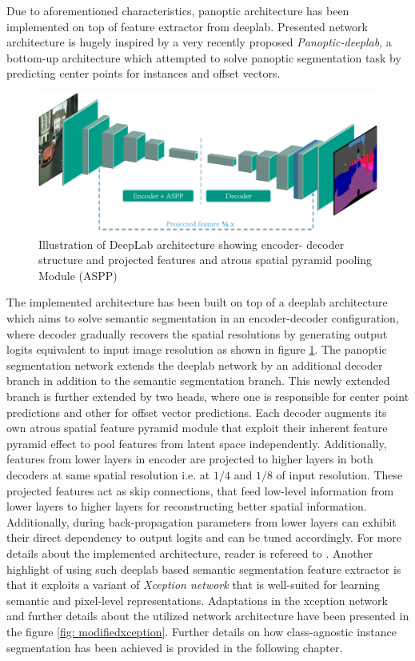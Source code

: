 Due to aforementioned characteristics, panoptic architecture has been implemented on top of feature extractor from deeplab. Presented network architecture is hugely inspired by a very recently proposed \textit{Panoptic-deeplab}, a bottom-up architecture which attempted to solve panoptic segmentation task by predicting center points for instances and offset vectors.

\begin{figure}[!ht]
\centering 
\includegraphics[width = \textwidth]{Graphics/Experimental_Setup/deeplab_image} 
\caption[DeepLab Architecture]{Illustration of DeepLab architecture showing encoder- decoder structure and projected features and atrous spatial pyramid pooling Module (ASPP)}
\label{fig: deeplab_diag} 
\end{figure}

The implemented architecture has been built on top of a deeplab architecture which aims to solve semantic segmentation in an encoder-decoder configuration, where decoder gradually recovers the spatial resolutions by generating output logits equivalent to input image resolution as shown in figure \ref{fig: deeplab_diag}. The panoptic segmentation network extends the deeplab network by an additional decoder branch in addition to the semantic segmentation branch. This newly extended branch is further extended by two heads, where one is responsible for center point predictions and other for offset vector predictions. Each decoder augments its own atrous spatial feature pyramid module that exploit their inherent feature pyramid effect to pool features from latent space independently. Additionally, features from lower layers in encoder are projected to higher layers in both decoders at same spatial resolution i.e. at $1/4$ and $1/8$ of input resolution. These projected features act as skip connections, that feed low-level information from lower layers to higher layers for reconstructing better spatial information. Additionally, during back-propagation parameters from lower layers can exhibit their direct dependency to output logits and can be tuned accordingly. For more details about the implemented architecture, reader is refereed to \cite{Cheng_2020_CVPR}. Another highlight of using such deeplab based semantic segmentation feature extractor is that it exploits a variant of \textit{Xception network} \cite{DBLP:journals/corr/Chollet16a} that is well-suited for learning semantic and pixel-level representations. Adaptations in the xception network and further details about the utilized network architecture have been presented in the figure \ref{fig: modifiedxception}. Further details on how class-agnostic instance segmentation has been achieved is provided in the following chapter.


